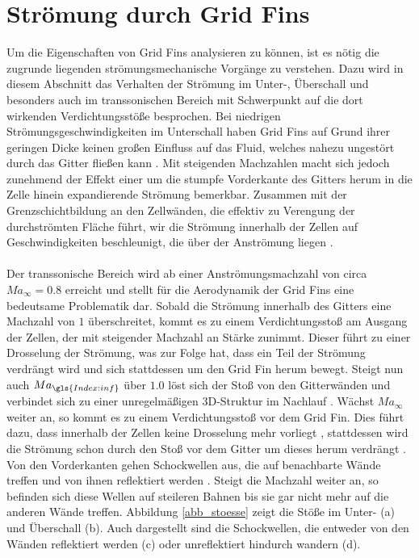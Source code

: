 \section{Strömung durch Grid Fins}\label{stroe}
Um die Eigenschaften von Grid Fins analysieren zu können, ist es nötig die zugrunde liegenden strömungsmechanische Vorgänge zu verstehen. Dazu wird in diesem Abschnitt das Verhalten der Strömung im Unter-, Überschall und besonders auch im transsonischen Bereich mit Schwerpunkt auf die dort wirkenden Verdichtungsstöße besprochen.
Bei niedrigen Strömungsgeschwindigkeiten im Unterschall haben Grid Fins auf Grund ihrer geringen Dicke keinen großen Einfluss auf das Fluid, welches nahezu ungestört durch das Gitter fließen kann \cite{sb-sharp}. Mit steigenden Machzahlen macht sich jedoch zunehmend der Effekt einer um die stumpfe Vorderkante des Gitters herum in die Zelle hinein expandierende Strömung bemerkbar. Zusammen mit der Grenzschichtbildung an den Zellwänden, die effektiv zu Verengung der durchströmten Fläche führt, wir die Strömung innerhalb der Zellen auf Geschwindigkeiten beschleunigt, die über der Anströmung liegen \cite{synopsis}.
\\~\\
Der transsonische Bereich wird ab einer Anströmungsmachzahl von circa $Ma_\infty=0.8$ erreicht \cite{machgrenzen} und stellt für die Aerodynamik der Grid Fins eine bedeutsame Problematik dar. Sobald die Strömung innerhalb des Gitters eine Machzahl von $1$ überschreitet, kommt es zu einem Verdichtungsstoß am Ausgang der Zellen, der mit steigender Machzahl an Stärke zunimmt. Dieser führt zu einer Drosselung der Strömung, was zur Folge hat, dass ein Teil der Strömung verdrängt wird und sich stattdessen um den Grid Fin herum bewegt. Steigt nun auch $Ma_{\gls{Index:inf}}$ über $1.0$ löst sich der Stoß von den Gitterwänden und verbindet sich zu einer unregelmäßigen 3D-Struktur im Nachlauf \cite{stroemung}. Wächst $Ma_\infty$ weiter an, so kommt es zu einem Verdichtungsstoß vor dem Grid Fin. Dies führt dazu, dass innerhalb der Zellen keine Drosselung mehr vorliegt \cite{stroemung}, stattdessen wird die Strömung schon durch den Stoß vor dem Gitter um dieses herum verdrängt \cite{synopsis}. Von den Vorderkanten gehen Schockwellen aus, die auf benachbarte Wände treffen und von ihnen reflektiert werden \cite{synopsis}. Steigt die Machzahl weiter an, so befinden sich diese Wellen auf steileren Bahnen bis sie gar nicht mehr auf die anderen Wände treffen. Abbildung \ref{abb_stoesse} zeigt die Stöße im Unter- (a) und Überschall (b). Auch dargestellt sind die Schockwellen, die entweder von den Wänden reflektiert werden (c) oder unreflektiert hindurch wandern (d).
